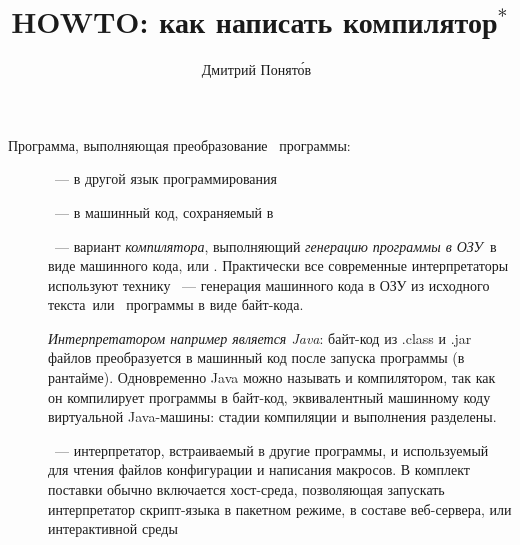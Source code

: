 
\author{Дмитрий Понят\'{о}в\ }
\title{HOWTO: как написать компилятор$^*$}
\secdown
\maketitle
\tableofcontents


Программа, выполняющая преобразование
\ программы:
\begin{description}
	\item[]\label{translator}\ ---
		в другой язык программирования
	\item[]\label{compiler}\ ---
		в машинный код, сохраняемый в 
	\item[]\label{interpreter}\ ---
		вариант \emph{компилятора}, выполняющий \emph{генерацию программы в
		ОЗУ}\ в виде машинного
		кода, или .
		Практически все современные интерпретаторы используют технику
		\ --- генерация машинного кода
		в ОЗУ из исходного текста\ или \ программы в виде
		байт-кода.
		
		\emph{Интерпретатором например является
		Java}:
		байт-код из .class и .jar файлов преобразуется в машинный код
		после запуска программы (в рантайме). Одновременно Java можно называть
		и компилятором, так как он компилирует программы в байт-код,
		эквивалентный машинному коду виртуальной Java-машины: стадии компиляции
		и выполнения разделены.
	\item[]\label{script}\ ---
		интерпретатор, встраиваемый в другие программы, и используемый
		для чтения файлов конфигурации и написания макросов. В комплект поставки
		обычно включается хост-среда, позволяющая запускать интерпретатор
		скрипт-языка в пакетном режиме,
		в составе веб-сервера, или интерактивной среды
\end{description}

